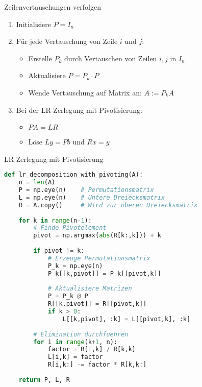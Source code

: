 \begin{KR}{Zeilenvertauschungen verfolgen}
\begin{enumerate}
    \item Initialisiere $P = I_n$
    \item Für jede Vertauschung von Zeile $i$ und $j$:
    \begin{itemize}
        \item Erstelle $P_k$ durch Vertauschen von Zeilen $i,j$ in $I_n$
        \item Aktualisiere $P = P_k \cdot P$
        \item Wende Vertauschung auf Matrix an: $A := P_kA$
    \end{itemize}
    \item Bei der LR-Zerlegung mit Pivotisierung:
    \begin{itemize}
        \item $PA = LR$ 
        \item Löse $Ly = Pb$ und $Rx = y$
    \end{itemize}
\end{enumerate}
\end{KR}

\begin{examplecode}{LR-Zerlegung mit Pivotisierung}
\begin{lstlisting}[language=Python, style=basesmol]
def lr_decomposition_with_pivoting(A):
    n = len(A)
    P = np.eye(n)    # Permutationsmatrix
    L = np.eye(n)    # Untere Dreiecksmatrix
    R = A.copy()     # Wird zur oberen Dreiecksmatrix
    
    for k in range(n-1):
        # Finde Pivotelement
        pivot = np.argmax(abs(R[k:,k])) + k
        
        if pivot != k:
            # Erzeuge Permutationsmatrix
            P_k = np.eye(n)
            P_k[[k,pivot]] = P_k[[pivot,k]]
            
            # Aktualisiere Matrizen
            P = P_k @ P
            R[[k,pivot]] = R[[pivot,k]]
            if k > 0:
                L[[k,pivot], :k] = L[[pivot,k], :k]
                
        # Elimination durchfuehren
        for i in range(k+1, n):
            factor = R[i,k] / R[k,k]
            L[i,k] = factor
            R[i,k:] -= factor * R[k,k:]
            
    return P, L, R
\end{lstlisting}
\end{examplecode}



